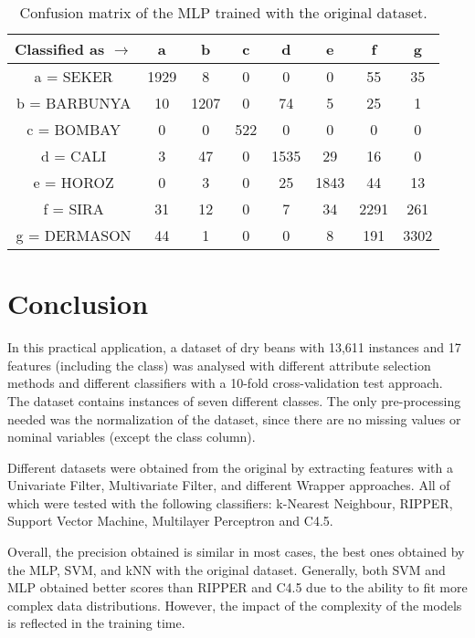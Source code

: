 \documentclass[a4paper,11pt]{article}
\begin{document}
\begin{table}[h]
\centering
\begin{tabular}{||c||c|c|c|c|c|c|c||}
	\hline
	Classified as $\rightarrow$ & a & b & c & d & e & f & g\\
	\hline
	\hline
	a = SEKER & 1929 & 8 & 0 & 0 & 0 & 55 & 35\\
	\hline
	b = BARBUNYA & 10 & 1207 & 0 & 74 & 5 & 25 & 1\\
	\hline
	c = BOMBAY & 0 & 0 & 522 & 0 & 0 & 0 & 0\\
	\hline	
	d = CALI & 3 & 47 & 0 & 1535 & 29 & 16 & 0\\
	\hline
	e = HOROZ & 0 & 3 & 0 & 25 & 1843 & 44 & 13\\
	\hline
	f = SIRA & 31 & 12 & 0 & 7 & 34 & 2291 & 261\\
	\hline
	g = DERMASON & 44 & 1 & 0 & 0 & 8 & 191 & 3302\\
    \hline 
\end{tabular}
\caption{Confusion matrix of the MLP trained with the original dataset.}
\label{tab:table8}
\end{table}

\section{Conclusion}
\label{sec:conclusion}

In this practical application, a dataset of dry beans with 13,611 instances and 17 features (including the class) was analysed with different attribute selection methods and different classifiers with a 10-fold cross-validation test approach. The dataset contains instances of seven different classes. The only pre-processing needed was the normalization of the dataset, since there are no missing values or nominal variables (except the class column).

Different datasets were obtained from the original by extracting features with a Univariate Filter, Multivariate Filter, and different Wrapper approaches. All of which were tested with the following classifiers: k-Nearest Neighbour, RIPPER, Support Vector Machine, Multilayer Perceptron and C4.5.

Overall, the precision obtained is similar in most cases, the best ones obtained by the MLP, SVM, and kNN with the original dataset. Generally, both SVM and MLP obtained better scores than RIPPER and C4.5 due to the ability to fit more complex data distributions. However, the impact of the complexity of the models is reflected in the training time.
\end{document}
